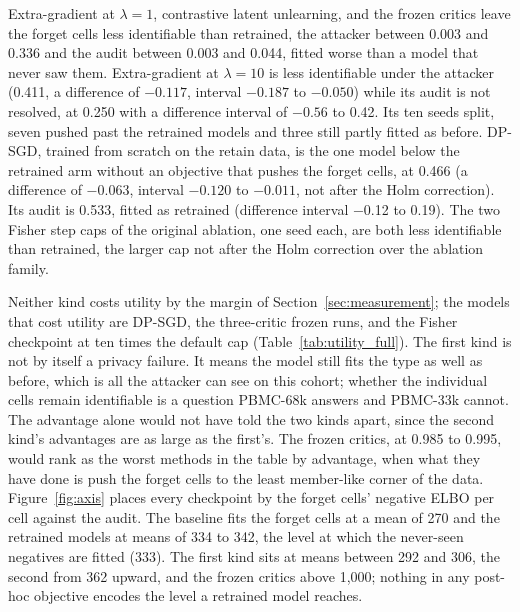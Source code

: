 \documentclass{article}
\begin{document}
Extra-gradient at $\lambda=1$, contrastive latent unlearning, and the frozen critics leave the forget cells less identifiable than retrained, the attacker between 0.003 and 0.336 and the audit between 0.003 and 0.044, fitted worse than a model that never saw them. Extra-gradient at $\lambda=10$ is less identifiable under the attacker (0.411, a difference of $-0.117$, interval $-0.187$ to $-0.050$) while its audit is not resolved, at 0.250 with a difference interval of $-0.56$ to 0.42. Its ten seeds split, seven pushed past the retrained models and three still partly fitted as before. DP-SGD, trained from scratch on the retain data, is the one model below the retrained arm without an objective that pushes the forget cells, at 0.466 (a difference of $-0.063$, interval $-0.120$ to $-0.011$, not after the Holm correction). Its audit is 0.533, fitted as retrained (difference interval $-$0.12 to 0.19). The two Fisher step caps of the original ablation, one seed each, are both less identifiable than retrained, the larger cap not after the Holm correction over the ablation family.

Neither kind costs utility by the margin of Section~\ref{sec:measurement}; the models that cost utility are DP-SGD, the three-critic frozen runs, and the Fisher checkpoint at ten times the default cap (Table~\ref{tab:utility_full}). The first kind is not by itself a privacy failure. It means the model still fits the type as well as before, which is all the attacker can see on this cohort; whether the individual cells remain identifiable is a question PBMC-68k answers and PBMC-33k cannot. The advantage alone would not have told the two kinds apart, since the second kind's advantages are as large as the first's. The frozen critics, at 0.985 to 0.995, would rank as the worst methods in the table by advantage, when what they have done is push the forget cells to the least member-like corner of the data. Figure~\ref{fig:axis} places every checkpoint by the forget cells' negative ELBO per cell against the audit. The baseline fits the forget cells at a mean of 270 and the retrained models at means of 334 to 342, the level at which the never-seen negatives are fitted (333). The first kind sits at means between 292 and 306, the second from 362 upward, and the frozen critics above 1,000; nothing in any post-hoc objective encodes the level a retrained model reaches.
\end{document}
